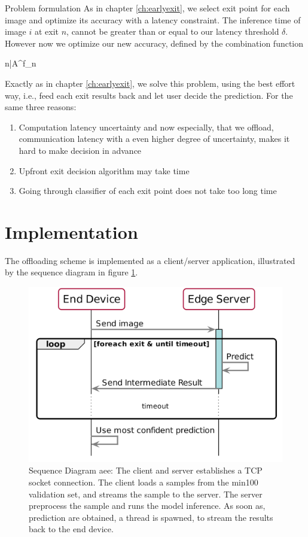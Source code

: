 \begin{enumdescript}
		\item[Problem formulation]   As in chapter \ref{ch:earlyexit}, we select exit point for each image and optimize its accuracy with a latency constraint. The inference time of image $ i $ at exit $ n $, cannot be greater than or equal to our latency threshold $ \delta $. However now we optimize our new accuracy, defined by the combination function
		
		
		\begin{maxi}
			{n}{\bar{A}^f_n}
			{}{}
		\end{maxi}
		
		Exactly as in chapter \ref{ch:earlyexit}, we solve this problem,  using the best effort way, i.e., feed each exit results back and let user decide the prediction. For the same three reasons:
		\begin{enumerate}
			\item Computation latency uncertainty and now especially, that we offload, communication latency with a even higher degree of uncertainty, makes it hard to make decision in advance
			\item Upfront exit decision algorithm may take time
			\item Going through classifier of each exit point does not take too long time
		\end{enumerate}
		
			
	\end{enumdescript}  

\section{Implementation} \label{sec:edge-implementation}

The offloading scheme is implemented as a client/server application, illustrated by the sequence diagram in figure \ref{fig:sequence-diagram}. 

\begin{figure}
	\captionsetup[subfigure]{justification=centering}
	\centering
	\includegraphics[width=.7\linewidth]{figures/models/sequence_diagram}
	\caption[Sequence Diagram \acrshort{aee}]{Sequence Diagram \acrshort{aee}: The client and server establishes a TCP socket connection. The client loads a samples from the \gls{min100} validation set, and streams the sample to the server. The server preprocess the sample and runs the model inference. As soon as, prediction are obtained, a thread is spawned, to stream the results back to the end device. }
	\label{fig:sequence-diagram}
\end{figure}

